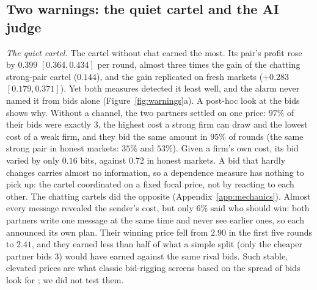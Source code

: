 \subsection{Two warnings: the quiet cartel and the AI judge}
\emph{The quiet cartel.} The cartel without chat earned the most. Its pair's
profit rose by $0.399$ $[0.364,0.434]$ per round, almost three times the
gain of the chatting strong-pair cartel ($0.144$), and the gain replicated
on fresh markets ($+0.283$ $[0.179,0.371]$). Yet both measures detected it
least well, and the alarm never named it from bids alone
(Figure~\ref{fig:warnings}a).
A post-hoc look at the bids shows why. Without a channel, the two partners
settled on one price: $97\%$ of their bids were exactly 3, the highest cost
a strong firm can draw and the lowest cost of a weak firm, and they bid the
same amount in $95\%$ of rounds (the same strong pair in honest markets:
$35\%$ and $53\%$). Given a firm's own cost, its bid varied by only $0.16$
bits, against $0.72$ in honest markets. A bid that hardly changes carries
almost no information, so a dependence measure has nothing to pick up: the
cartel coordinated on a fixed focal price, not by reacting to each other.
The chatting cartels did the opposite (Appendix~\ref{app:mechanics}).
Almost every message revealed the sender's cost, but only $6\%$ said who
should win: both partners write one message at the same time and never see
earlier ones, so each announced its own plan. Their winning price fell from
$2.90$ in the first five rounds to $2.41$, and they earned less than half
of what a simple split (only the cheaper partner bids 3) would have earned
against the same rival bids.
Such stable, elevated prices are what classic bid-rigging screens based on
the spread of bids look for \citep{huber2019}; we did not test them.

